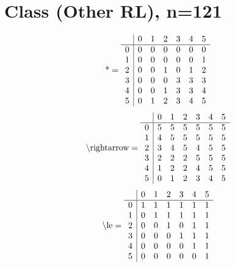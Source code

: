 \documentclass[11pt]{article}
\begin{document}
\section{Class (Other RL), n=121}
\[\text{*} = 
\begin{array}{r | r r r r r r}
 & 0 & 1 & 2 & 3 & 4 & 5 \\ \hline
0 & 0 & 0 & 0 & 0 & 0 & 0 \\
1 & 0 & 0 & 0 & 0 & 0 & 1 \\
2 & 0 & 0 & 1 & 0 & 1 & 2 \\
3 & 0 & 0 & 0 & 3 & 3 & 3 \\
4 & 0 & 0 & 1 & 3 & 3 & 4 \\
5 & 0 & 1 & 2 & 3 & 4 & 5 \\
\end{array}
\]
\[\text{\textbackslash rightarrow} = 
\begin{array}{r | r r r r r r}
 & 0 & 1 & 2 & 3 & 4 & 5 \\ \hline
0 & 5 & 5 & 5 & 5 & 5 & 5 \\
1 & 4 & 5 & 5 & 5 & 5 & 5 \\
2 & 3 & 4 & 5 & 4 & 5 & 5 \\
3 & 2 & 2 & 2 & 5 & 5 & 5 \\
4 & 1 & 2 & 2 & 4 & 5 & 5 \\
5 & 0 & 1 & 2 & 3 & 4 & 5 \\
\end{array}
\]
\[\text{\textbackslash le} = 
\begin{array}{r | r r r r r r}
 & 0 & 1 & 2 & 3 & 4 & 5 \\ \hline
0 & 1 & 1 & 1 & 1 & 1 & 1 \\
1 & 0 & 1 & 1 & 1 & 1 & 1 \\
2 & 0 & 0 & 1 & 0 & 1 & 1 \\
3 & 0 & 0 & 0 & 1 & 1 & 1 \\
4 & 0 & 0 & 0 & 0 & 1 & 1 \\
5 & 0 & 0 & 0 & 0 & 0 & 1 \\
\end{array}
\]
\end{document}
